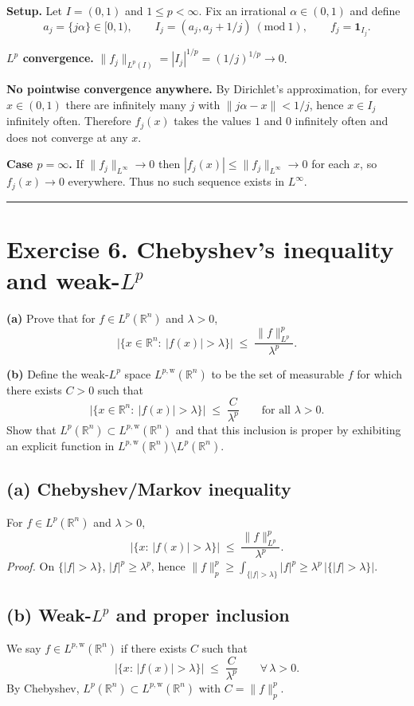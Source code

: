 \documentclass[12pt,a4paper]{article}
\theoremstyle{plain}
\theoremstyle{definition}
\theoremstyle{remark}
\theoremstyle{remark}
\theoremstyle{definition}
\begin{document}
\textbf{Setup.} Let $I=(0,1)$ and $1\le p<\infty$. Fix an irrational $\alpha\in(0,1)$ and define
\[
a_j=\{j\alpha\}\in[0,1), \qquad
I_j=(a_j,a_j+1/j)\ (\mathrm{mod}\ 1), \qquad
f_j=\mathbf 1_{I_j}.
\]

\textbf{$L^p$ convergence.} $\|f_j\|_{L^p(I)} = |I_j|^{1/p} = (1/j)^{1/p}\to 0$.

\textbf{No pointwise convergence anywhere.}
By Dirichlet’s approximation, for every $x\in(0,1)$ there are infinitely many $j$ with
$\|j\alpha-x\|<1/j$, hence $x\in I_j$ infinitely often.
Therefore $f_j(x)$ takes the values $1$ and $0$ infinitely often and does not converge at any $x$.

\textbf{Case $p=\infty$.} If $\|f_j\|_{L^\infty}\to 0$ then $|f_j(x)|\le \|f_j\|_{L^\infty}\to 0$
for each $x$, so $f_j(x)\to 0$ everywhere. Thus no such sequence exists in $L^\infty$.

\bigskip\hrule\bigskip

\section*{Exercise 6. Chebyshev’s inequality and weak-$L^p$}

\textbf{(a)} Prove that for $f\in L^p(\mathbb{R}^n)$ and $\lambda>0$,
\[
\big|\{x\in\mathbb{R}^n:\ |f(x)|>\lambda\}\big|
\;\le\; \frac{\|f\|_{L^p}^p}{\lambda^p}.
\]

\medskip
\textbf{(b)} Define the weak-$L^p$ space $L^{p,\mathrm{w}}(\mathbb{R}^n)$ to be the set of measurable
$f$ for which there exists $C>0$ such that
\[
\big|\{x\in\mathbb{R}^n:\ |f(x)|>\lambda\}\big|
\;\le\; \frac{C}{\lambda^p}\qquad\text{for all }\lambda>0.
\]
Show that $L^p(\mathbb{R}^n)\subset L^{p,\mathrm{w}}(\mathbb{R}^n)$ and that this inclusion is proper by
exhibiting an explicit function in $L^{p,\mathrm{w}}(\mathbb{R}^n)\setminus L^p(\mathbb{R}^n)$.

\subsection*{(a) Chebyshev/Markov inequality}
For $f\in L^p(\mathbb{R}^n)$ and $\lambda>0$,
\[
\big|\{x:\,|f(x)|>\lambda\}\big|
\;\le\; \frac{\|f\|_{L^p}^p}{\lambda^p}.
\]
\emph{Proof.} On $\{|f|>\lambda\}$, $|f|^p\ge \lambda^p$, hence
$\|f\|_p^p \ge \int_{\{|f|>\lambda\}} |f|^p \ge \lambda^p\,|\{|f|>\lambda\}|$.

\subsection*{(b) Weak-$L^p$ and proper inclusion}
We say $f\in L^{p,\mathrm{w}}(\mathbb{R}^n)$ if there exists $C$ such that
\[
\big|\{x:\,|f(x)|>\lambda\}\big| \;\le\; \frac{C}{\lambda^p}
\qquad\forall\,\lambda>0.
\]
By Chebyshev, $L^p(\mathbb{R}^n)\subset L^{p,\mathrm{w}}(\mathbb{R}^n)$ with $C=\|f\|_p^p$.
\end{document}
